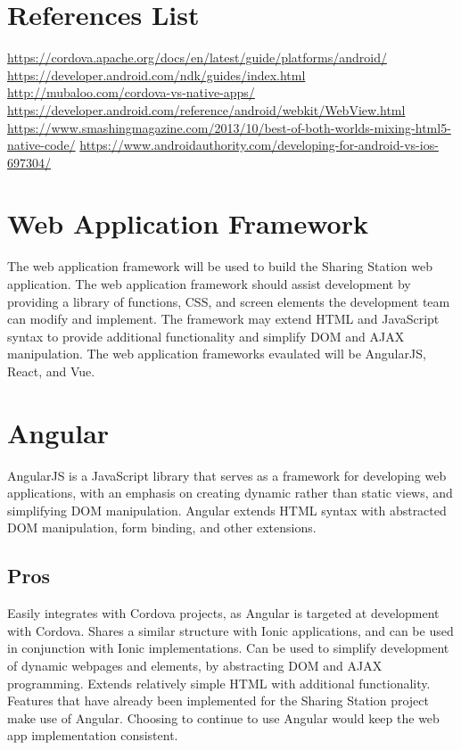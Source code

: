 \documentclass[letterpaper,10pt,draftclsnofoot,onecolumn]{IEEEtran}
\begin{document}
\section*{References List}
\url{https://cordova.apache.org/docs/en/latest/guide/platforms/android/}\newline
\url{https://developer.android.com/ndk/guides/index.html}\newline
\url{http://mubaloo.com/cordova-vs-native-apps/}\newline
\url{https://developer.android.com/reference/android/webkit/WebView.html}\newline
\url{https://www.smashingmagazine.com/2013/10/best-of-both-worlds-mixing-html5-native-code/}\newline
\url{https://www.androidauthority.com/developing-for-android-vs-ios-697304/}\newline

\pagebreak
\section*{Web Application Framework}
The web application framework will be used to build the Sharing Station web application. The web application framework should assist development by providing a library of functions, CSS, and screen elements the development team can modify and implement. The framework may extend HTML and JavaScript syntax to provide additional functionality and simplify DOM and AJAX manipulation. The web application frameworks evaulated will be AngularJS, React, and Vue.
\section*{Angular}
AngularJS is a JavaScript library that serves as a framework for developing web applications, with an emphasis on creating dynamic rather than static views, and simplifying DOM manipulation. Angular extends HTML syntax with abstracted DOM manipulation, form binding, and other extensions.
\subsection*{Pros}
Easily integrates with Cordova projects, as Angular is targeted at development with Cordova.
Shares a similar structure with Ionic applications, and can be used in conjunction with Ionic implementations.
Can be used to simplify development of dynamic webpages and elements, by abstracting DOM and AJAX programming.
Extends relatively simple HTML with additional functionality.
Features that have already been implemented for the Sharing Station project make use of Angular. Choosing to continue to use Angular would keep the web app implementation consistent.
\end{document}
